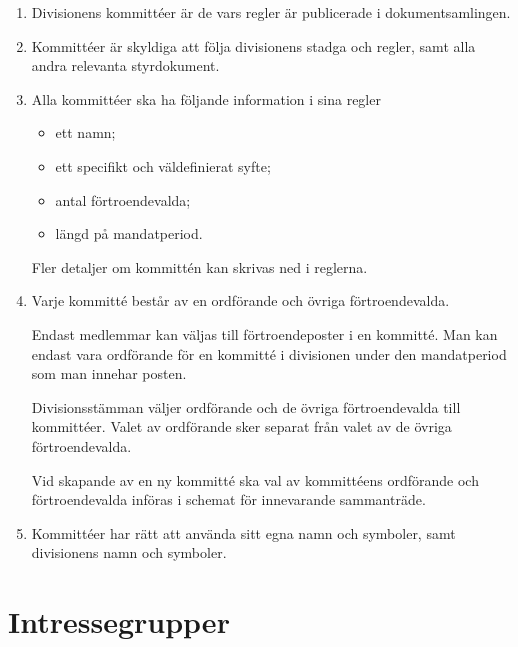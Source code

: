 \documentclass{dvd}
\begin{document}
	\begin{enumerate}[label=\arabic* §, ref=\arabic*]
		\item Divisionens kommittéer är de vars regler är publicerade i dokumentsamlingen.

		\item Kommittéer är skyldiga att följa divisionens stadga och regler, samt alla andra relevanta styrdokument.

		\item Alla kommittéer ska ha följande information i sina regler

		\begin{itemize}
			\item ett namn;

			\item ett specifikt och väldefinierat syfte;

			\item antal förtroendevalda;

			\item längd på mandatperiod.
		\end{itemize}

		Fler detaljer om kommittén kan skrivas ned i reglerna.

		\item Varje kommitté består av en ordförande och övriga förtroendevalda.

		Endast medlemmar kan väljas till förtroendeposter i en kommitté.
		Man kan endast vara ordförande för en kommitté i divisionen under den mandatperiod som man innehar posten.

		Divisionsstämman väljer ordförande och de övriga förtroendevalda till kommittéer.
		Valet av ordförande sker separat från valet av de övriga förtroendevalda.

		Vid skapande av en ny kommitté ska val av kommittéens ordförande och förtroendevalda införas i schemat för innevarande sammanträde.

		\item Kommittéer har rätt att använda sitt egna namn och symboler, samt divisionens namn och symboler.
	\end{enumerate}

	\section{Intressegrupper}
\end{document}
